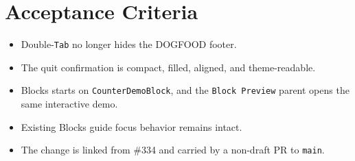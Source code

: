 \section{Acceptance Criteria}\label{record-115-acceptance-criteria}

\begin{itemize}
\tightlist
\item
  Double-\texttt{T\allowbreak{}a\allowbreak{}b} no longer hides the DOGFOOD footer.
\item
  The quit confirmation is compact, filled, aligned, and theme-readable.
\item
  Blocks starts on \texttt{C\allowbreak{}o\allowbreak{}u\allowbreak{}n\allowbreak{}t\allowbreak{}e\allowbreak{}r\allowbreak{}D\allowbreak{}e\allowbreak{}m\allowbreak{}o\allowbreak{}B\allowbreak{}l\allowbreak{}o\allowbreak{}c\allowbreak{}k}, and the \texttt{B\allowbreak{}l\allowbreak{}o\allowbreak{}c\allowbreak{}k\allowbreak{} \allowbreak{}P\allowbreak{}r\allowbreak{}e\allowbreak{}v\allowbreak{}i\allowbreak{}e\allowbreak{}w} parent opens the same interactive demo.
\item
  Existing Blocks guide focus behavior remains intact.
\item
  The change is linked from \#334 and carried by a non-draft PR to \texttt{m\allowbreak{}a\allowbreak{}i\allowbreak{}n}.
\end{itemize}

